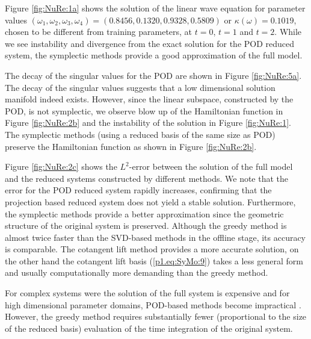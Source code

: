 Figure \ref{fig:NuRe:1a} shows the solution of the linear wave equation for parameter values $(\omega_1,\omega_2,\omega_3,\omega_4) = (0.8456,0.1320,0.9328,0.5809)$ or $\kappa(\omega) = 0.1019$, chosen to be different from training parameters, at $t=0$, $t = 1$ and $t=2$. While we see instability and divergence from the exact solution for the POD reduced system, the symplectic methods provide a good approximation of the full model. 

The decay of the singular values for the POD are shown in Figure \ref{fig:NuRe:5a}. The decay of the singular values suggests that a low dimensional solution manifold indeed exists. However, since the linear subspace, constructed by the POD, is not symplectic, we observe blow up of the Hamiltonian function in Figure \ref{fig:NuRe:2b} and the instability of the solution in Figure \ref{fig:NuRe:1}. The symplectic methods (using a reduced basis of the same size as POD) preserve the Hamiltonian function as shown in Figure \ref{fig:NuRe:2b}.

Figure \ref{fig:NuRe:2c} shows the $L^2$-error between the solution of the full model and the reduced systems constructed by different methods. We note that the error for the POD reduced system rapidly increases, confirming that the projection based reduced system does not yield a stable solution. Furthermore, the symplectic methods provide a better approximation since the geometric structure of the original system is preserved. Although the greedy method is almost twice faster than the SVD-based methods in the offline stage, its accuracy is comparable. The cotangent lift method provides a more accurate solution, on the other hand the cotangent lift basis (\ref{p1.eq:SyMo:9}) takes a less general form and usually computationally more demanding than the greedy method.

For complex systems were the solution of the full system is expensive and for high dimensional parameter domains, POD-based methods become impractical \cite{hesthaven2015certified,quarteroni2015reduced}. However, the greedy method requires substantially fewer (proportional to the size of the reduced basis) evaluation of the time integration of the original system.

